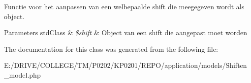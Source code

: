 Functie voor het aanpassen van een welbepaalde shift die meegegeven wordt als object. 
\begin{DoxyParams}[1]{Parameters}
std\+Class & {\em \$shift} & Object van een shift die aangepast moet worden \\
\hline
\end{DoxyParams}


The documentation for this class was generated from the following file\+:\begin{DoxyCompactItemize}
\item 
E\+:/\+D\+R\+I\+V\+E/\+C\+O\+L\+L\+E\+G\+E/\+T\+M/\+P0202/\+K\+P0201/\+R\+E\+P\+O/application/models/Shiften\+\_\+model.\+php\end{DoxyCompactItemize}
